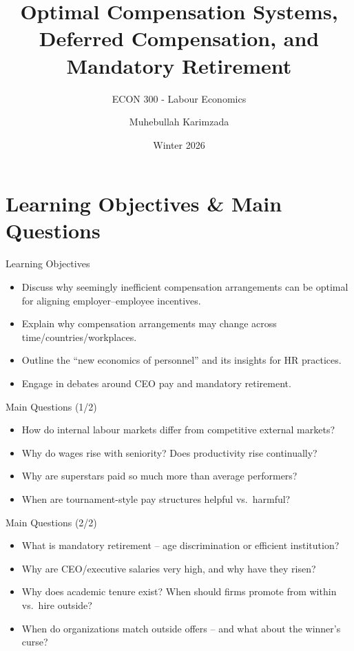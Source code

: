 \documentclass[aspectratio=169]{beamer}
\title{\textbf{Optimal Compensation Systems, Deferred Compensation, and Mandatory Retirement \vspace{.5cm}\\  }}
\subtitle{ {\large ECON 300 - Labour Economics}}
\author{Muhebullah Karimzada}
\date{Winter 2026}
\begin{document}
\begin{frame}[plain]
  \titlepage
\end{frame}

\section{Learning Objectives \& Main Questions}

\begin{frame}{Learning Objectives}
\transfade
\begin{itemize}[<+->]
  \item Discuss why seemingly inefficient compensation arrangements can be optimal for aligning employer--employee incentives.
  \item Explain why compensation arrangements may change across time/countries/workplaces.
  \item Outline the ``new economics of personnel'' and its insights for HR practices.
  \item Engage in debates around CEO pay and mandatory retirement.
\end{itemize}
\end{frame}

\begin{frame}{Main Questions (1/2)}
\transfade
\begin{itemize}[<+->]
  \item How do internal labour markets differ from competitive external markets?
  \item Why do wages rise with seniority? Does productivity rise continually?
  \item Why are superstars paid so much more than average performers?
  \item When are tournament-style pay structures helpful vs.\ harmful?
\end{itemize}
\end{frame}

\begin{frame}{Main Questions (2/2)}
\transfade
\begin{itemize}[<+->]
  \item What is mandatory retirement -- age discrimination or efficient institution?
  \item Why are CEO/executive salaries very high, and why have they risen?
  \item Why does academic tenure exist? When should firms promote from within vs.\ hire outside?
  \item When do organizations match outside offers -- and what about the winner's curse?
\end{itemize}
\end{frame}
\end{document}
